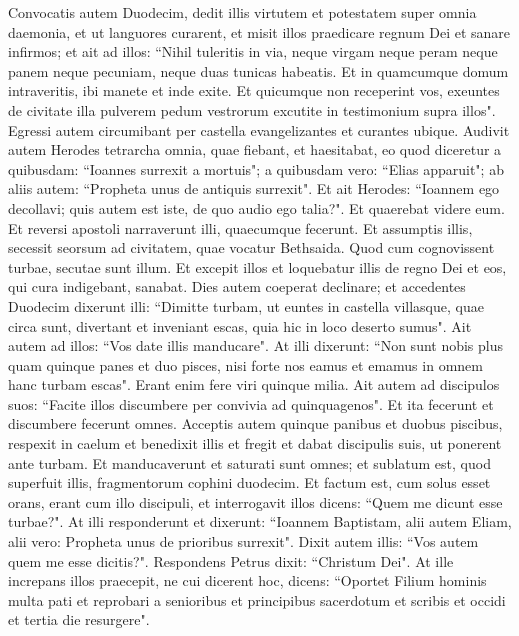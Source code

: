 \begin{biblechapter}  
\verse Convocatis autem Duodecim, dedit illis virtutem et potestatem super omnia daemonia, et ut languores curarent, 
\verse et misit illos praedicare regnum Dei et sanare infirmos; 
\verse et ait ad illos: “Nihil tuleritis in via, neque virgam neque peram neque panem neque pecuniam, neque duas tunicas habeatis.  
\verse Et in quamcumque domum intraveritis, ibi manete et inde exite. 
\verse Et quicumque non receperint vos, exeuntes de civitate illa pulverem pedum vestrorum excutite in testimonium supra illos". 
\verse Egressi autem circumibant per castella evangelizantes et curantes ubique. 
\verse Audivit autem Herodes tetrarcha omnia, quae fiebant, et haesitabat, eo quod diceretur a quibusdam: “Ioannes surrexit a mortuis"; 
\verse a quibusdam vero: “Elias apparuit"; ab aliis autem: “Propheta unus de antiquis surrexit". 
\verse Et ait Herodes: “Ioannem ego decollavi; quis autem est iste, de quo audio ego talia?". Et quaerebat videre eum. 
\verse Et reversi apostoli narraverunt illi, quaecumque fecerunt. Et assumptis illis, secessit seorsum ad civitatem, quae vocatur Bethsaida. 
\verse Quod cum cognovissent turbae, secutae sunt illum. Et excepit illos et loquebatur illis de regno Dei et eos, qui cura indigebant, sanabat. 
\verse Dies autem coeperat declinare; et accedentes Duodecim dixerunt illi: “Dimitte turbam, ut euntes in castella villasque, quae circa sunt, divertant et inveniant escas, quia hic in loco deserto sumus". 
\verse Ait autem ad illos: “Vos date illis manducare". At illi dixerunt: “Non sunt nobis plus quam quinque panes et duo pisces, nisi forte nos eamus et emamus in omnem hanc turbam escas". 
\verse Erant enim fere viri quinque milia. Ait autem ad discipulos suos: “Facite illos discumbere per convivia ad quinquagenos". 
\verse Et ita fecerunt et discumbere fecerunt omnes. 
\verse Acceptis autem quinque panibus et duobus piscibus, respexit in caelum et benedixit illis et fregit et dabat discipulis suis, ut ponerent ante turbam. 
\verse Et manducaverunt et saturati sunt omnes; et sublatum est, quod superfuit illis, fragmentorum cophini duodecim. 
\verse Et factum est, cum solus esset orans, erant cum illo discipuli, et interrogavit illos dicens: “Quem me dicunt esse turbae?". 
\verse At illi responderunt et dixerunt: “Ioannem Baptistam, alii autem Eliam, alii vero: Propheta unus de prioribus surrexit". 
\verse Dixit autem illis: “Vos autem quem me esse dicitis?". Respondens Petrus dixit: “Christum Dei". 
\verse At ille increpans illos praecepit, ne cui dicerent hoc, 
\verse dicens: “Oportet Filium hominis multa pati et reprobari a senioribus et principibus sacerdotum et scribis et occidi et tertia die resurgere". 

\end{biblechapter}
